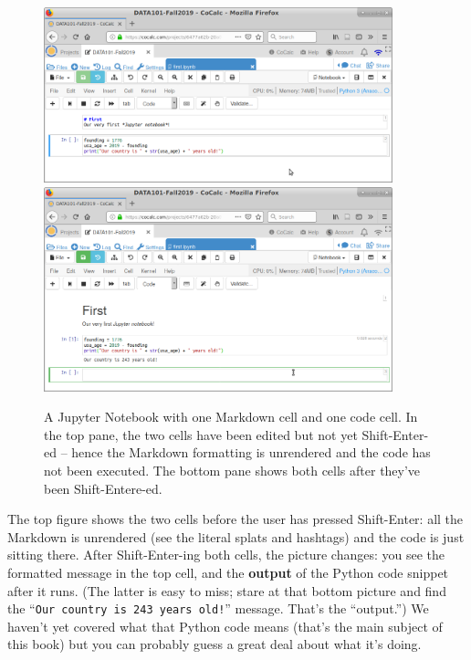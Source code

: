 \begin{figure}[!h]
\centering
\includegraphics[width=0.9\textwidth]{firstNotebook.png} \\
\bigskip
\includegraphics[width=0.9\textwidth]{firstNotebook2.png}
\bigskip
\caption{A Jupyter Notebook with one Markdown cell and one code
cell. In the top pane, the two cells have
been edited but not yet Shift-Enter-ed -- hence the Markdown formatting is
unrendered and the code has not been executed. The bottom pane shows both cells
after they've been Shift-Entere-ed.}
\label{fig:jupyterNotebook}
\end{figure}

\label{code snippet}
\label{snippet}
\label{output}
The top figure shows the two cells before the user has pressed Shift-Enter: all
the Markdown is unrendered (see the literal splats and hashtags) and the code
is just sitting there. After Shift-Enter-ing both cells, the picture changes:
you see the formatted message in the top cell, and the \textbf{output} of the
Python code snippet after it runs. (The latter is easy to miss; stare at that
bottom picture and find the ``\texttt{Our country is 243 years old!}'' message.
That's the ``output.'') We haven't yet covered what that Python code means
(that's the main subject of this book) but you can probably guess a great deal
about what it's doing.

